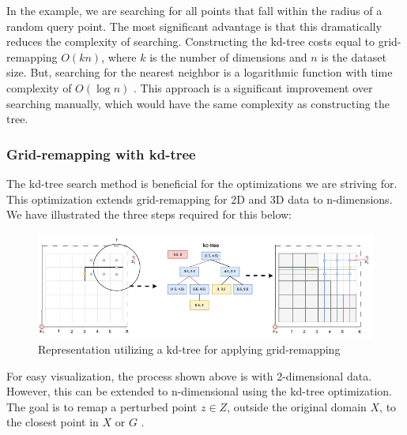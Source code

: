 In the example, we are searching for all points that fall within the radius of a random query point.
The most significant advantage is that this dramatically reduces the complexity of searching.
Constructing the kd-tree costs equal to grid-remapping $O(kn)$, where $k$ is the number of dimensions and $n$ is the dataset size.
But, searching for the nearest neighbor is a logarithmic function with time complexity of $O(\log n)$ \citep{washington_k-d_2002}.
This approach is a significant improvement over searching manually, which would have the same complexity as constructing the tree.

\subsubsection{Grid-remapping with kd-tree} \label{theory:grid-remapping}
The kd-tree search method is beneficial for the optimizations we are striving for.
This optimization extends grid-remapping for 2D \citep{DBLP:journals/corr/abs-1212-1984} and 3D data \citep{9646489} to n-dimensions. \newline
We have illustrated the three steps required for this below:
\begin{figure}[H]
  \includegraphics[width=1\textwidth]{TheorethicalFramework/ND-Laplace/Images/KD-tree.png}
  \caption{Representation utilizing a kd-tree for applying grid-remapping \citep{DBLP:journals/corr/abs-1212-1984}}
  \label{fig:kd-tree}
\end{figure}
For easy visualization, the process shown above is with 2-dimensional data.
However, this can be extended to n-dimensional using the kd-tree optimization.
The goal is to remap a perturbed point $z \in Z$, outside the original domain $X$, to the closest point in $X$ or $G$ \citep{DBLP:journals/corr/abs-1212-1984}.

